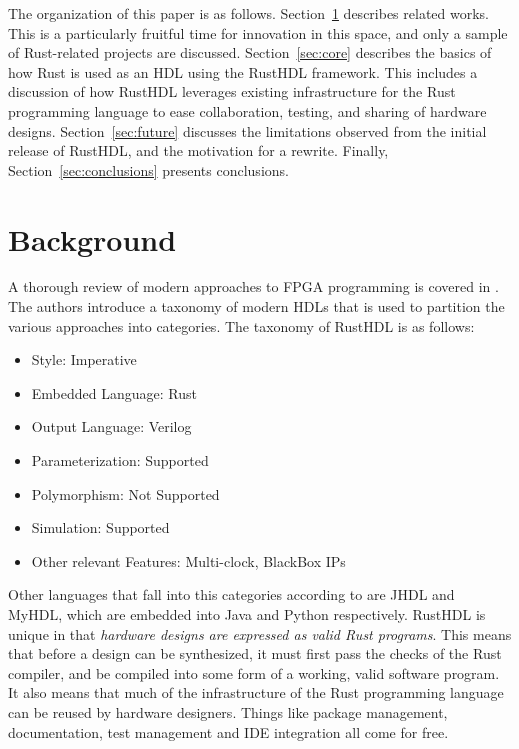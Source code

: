 \documentclass[conference]{IEEEtran}
\begin{document}
The organization of this paper is as follows.  Section~\ref{sec:related} describes related
works.  This is a particularly fruitful time for innovation in this space, and only a
sample of Rust-related projects are discussed. Section~\ref{sec:core} describes the 
basics of how Rust is used as an HDL using the RustHDL
framework.  This includes a discussion of how RustHDL leverages existing infrastructure 
for the Rust programming language to ease collaboration, testing, and sharing of hardware 
designs.  Section~\ref{sec:future} discusses the limitations observed from the initial
release of RustHDL, and the motivation for a rewrite.  Finally, Section~\ref{sec:conclusions}
presents conclusions.

\section{Background}\label{sec:related}

A thorough review of modern approaches to FPGA programming is covered in \cite{b5b}.  The 
authors introduce a taxonomy of modern HDLs that is used to partition the various approaches
into categories.  The taxonomy of RustHDL is as follows:

\begin{itemize} 
  \item Style: Imperative
  \item Embedded Language: Rust
  \item Output Language: Verilog
  \item Parameterization: Supported
  \item Polymorphism: Not Supported
  \item Simulation: Supported
  \item Other relevant Features: Multi-clock, BlackBox IPs
\end{itemize}

Other languages that fall into this categories according to \cite{b5b} are JHDL and MyHDL,
which are embedded into Java and Python respectively.   
RustHDL is unique in that \emph{hardware designs are expressed as valid Rust programs}.
This means that before a design can be synthesized, it must first pass the checks of the Rust
compiler, and be compiled into some form of a working, valid software program.
It also means that much of the infrastructure of the Rust programming language can be reused
by hardware designers.  Things like package management, documentation, test management and IDE 
integration all come for free.
\end{document}
